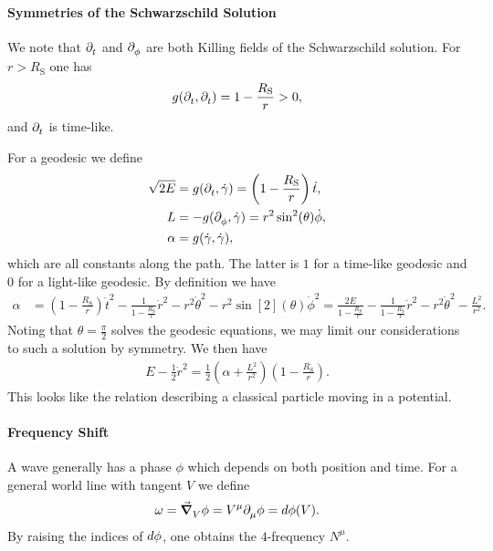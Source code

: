 \paragraph{Symmetries of the Schwarzschild Solution}
We note that $\partial^{}_{t}$ and $\partial^{}_{\phi}$ are both Killing fields of the Schwarzschild solution. For $r > R_{\text{S}}$ one has
\begin{align*}
	g(\partial^{}_{t}, \partial^{}_{t}) = 1 - \frac{R_{\text{S}}}{r} > 0,
\end{align*}
and $\partial^{}_{t}$ is time-like.

For a geodesic we define
\begin{align*}
	\sqrt{2E} &= g(\partial^{}_{t}, \dot{\gamma}) = \left(1 - \frac{R_{\text{S}}}{r}\right)\dot{t}, \\
	L         &= -g(\partial^{}_{\phi}, \dot{\gamma}) = r^{2}\sin[2](\theta)\dot{\phi}, \\
	\alpha    &= g(\dot{\gamma}, \dot{\gamma}),
\end{align*}
which are all constants along the path. The latter is $1$ for a time-like geodesic and $0$ for a light-like geodesic. By definition we have
\begin{align*}
	\alpha &= \left(1 - \frac{R_{\text{S}}}{r}\right)\dot{t}^{2} - \frac{1}{1 - \frac{R_{\text{S}}}{r}}\dot{r}^{2} - r^{2}\dot{\theta}^{2}  - r^{2}\sin[2](\theta)\dot{\phi}^{2} = \frac{2E}{1 - \frac{R_{\text{S}}}{r}} - \frac{1}{1 - \frac{R_{\text{S}}}{r}}\dot{r}^{2} - r^{2}\dot{\theta}^{2} - \frac{L^{2}}{r^{2}}.
\end{align*}
Noting that $\theta = \frac{\pi}{2}$ solves the geodesic equations, we may limit our considerations to such a solution by symmetry. We then have
\begin{align*}
	E - \frac{1}{2}\dot{r}^{2} = \frac{1}{2}\left(\alpha + \frac{L^{2}}{r^{2}}\right)\left(1 - \frac{R_{\text{S}}}{r}\right).
\end{align*}
This looks like the relation describing a classical particle moving in a potential.

\paragraph{Frequency Shift}
A wave generally has a phase $\phi$ which depends on both position and time. For a general world line with tangent $V$ we define
\begin{align*}
	\omega = \grad_{V}^{}{\phi} = V^{\mu}\partial^{}_{\mu}\phi = d\phi(V).
\end{align*}
By raising the indices of $d\phi$, one obtains the $4$-frequency $N^{\mu}$.

